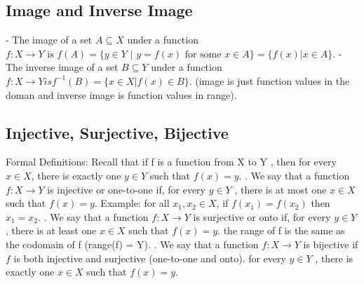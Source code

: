 \documentclass{article}
\begin{document}
\subsection{Image and Inverse Image}
- The image of a set $A \subseteq X$ under a function $f : X \rightarrow Y \text{ is } f(A) = \{ y \in Y \text{ | } y = f(x) \text{ for some } x \in A\} = \{f(x)|x \in A\}$.
\newline
\newline
- The inverse image of a set $B \subseteq Y$ under a function $f : X \rightarrow Y is f^{-1}(B) = \{ x \in X |f(x) \in B \}$.
\newline
\newline
(image is just function values in the doman and inverse image is function values in range).
\newline
\newline
{}
\newline
{}
\newpage
\subsection{Injective, Surjective, Bijective}
Formal Definitions:
\newline
\newline
Recall that if f is a function from X to Y , then   for every $x \in X$, there is exactly one $y \in Y$ such that $f(x) = y$.
\newline
{}. We say that a function $f : X \rightarrow Y$ is injective or one-to-one if, for every $y \in Y$ , there is at most one $x \in X$ such that $f(x) = y$. 
  \newline
  Example: for all $x_1,x_2 \in X$, if $f(x_1) = f(x_2)$ then $x_1 = x_2$.  
  \newline
  . We say that a function $f : X \rightarrow Y$ is surjective or onto if, for every $y \in Y$ , there is at least one $x \in X$ such that $f(x) = y$.
  the range of f is the same as the codomain of f (range(f) = Y).
  \newline
  . We say that a function $f : X \rightarrow Y$ is bijective if $f$ is both injective and surjective (one-to-one and onto).   
  \newline
  \newline
  for every $y \in Y$ , there is exactly one $x \in X$ such that $f(x) = y$.
  \newpage
\end{document}
